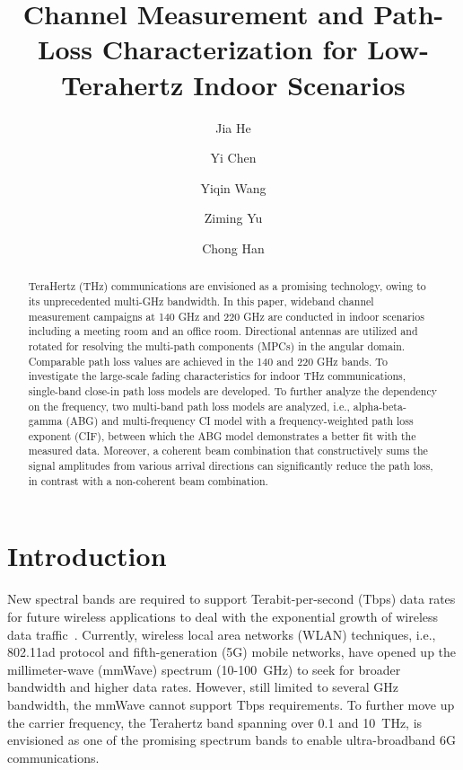 \documentclass[conference]{IEEEtran}
\begin{document}



\title{Channel Measurement and Path-Loss Characterization for Low-Terahertz Indoor Scenarios} 
\author[1]{{Jia He}}
\author[2]{{Yi Chen}}
\author[2]{{Yiqin Wang}}
\author[1]{{Ziming Yu}}
\author[2]{{Chong Han}}

\maketitle 

 
\begin{abstract}
TeraHertz (THz) communications are envisioned as a promising technology, owing to its unprecedented multi-GHz bandwidth. In this paper, wideband channel measurement campaigns at 140 GHz and 220 GHz are conducted in indoor scenarios including a meeting room and an office room. Directional antennas are utilized and rotated for resolving the multi-path components (MPCs) in the angular domain. Comparable path loss values are achieved in the 140 and 220 GHz bands. To investigate the large-scale fading characteristics for indoor THz communications, single-band close-in path loss models are developed. To further analyze the dependency on the frequency, two multi-band path loss models are analyzed, i.e., alpha-beta-gamma (ABG) and multi-frequency CI model with a frequency-weighted path loss exponent (CIF), between which the ABG model demonstrates a better fit with the measured data. Moreover, a coherent beam combination that constructively sums the signal amplitudes from various arrival directions can significantly reduce the path loss, in contrast with a non-coherent beam combination.
\boldmath

\end{abstract}
\section{Introduction}
 New spectral bands are required to support Terabit-per-second (Tbps) data rates for future wireless applications to deal with the exponential growth of wireless data traffic~\cite{chong2017thz,chen2019channel}. Currently, wireless local area networks (WLAN) techniques, i.e., 802.11ad protocol and fifth-generation (5G) mobile networks, have opened up the millimeter-wave (mmWave) spectrum (10-100~GHz) to seek for broader bandwidth and higher data rates. However, still limited to several GHz bandwidth, the mmWave cannot support Tbps requirements. To further move up the carrier frequency, the Terahertz band spanning over 0.1 and 10~THz, is envisioned as one of the promising spectrum bands to enable ultra-broadband 6G communications.
\end{document}
